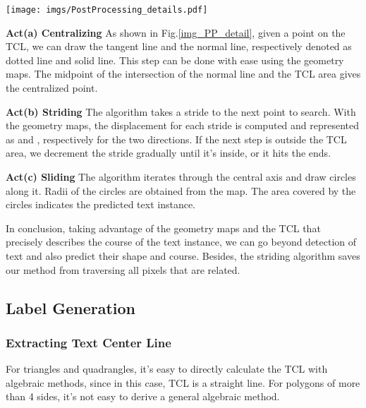 \documentclass[runningheads]{llncs}
\begin{document}
\begin{figure*}
\begin{centering}
\texttt{[image: imgs/PostProcessing\_details.pdf]}
\par\end{centering}
\vspace{-4mm}
\caption{Mechanisms of Centralizing, Striding and Sliding}
\label{img_PP_detail}
\end{figure*}

\noindent\textbf{Act(a) Centralizing} As shown in Fig.\ref{img_PP_detail}, given a point on the TCL, we can draw the tangent line and the normal line, respectively denoted as dotted line and solid line.  This step can be done with ease using the geometry maps. The midpoint of the intersection of the normal line and the TCL area gives the centralized point.

\noindent\textbf{Act(b) Striding} The algorithm takes a stride to the next point to search. With the geometry maps, the displacement for each stride is computed and represented as  and , respectively for the two directions. If the next step is outside the TCL area, we decrement the stride gradually until it's inside, or it hits the ends.

\noindent\textbf{Act(c) Sliding} The algorithm iterates through the central axis and draw circles along it.  Radii of the circles are obtained from the  map. The area covered by the circles indicates the predicted text instance.



In conclusion, taking advantage of the geometry maps and the TCL that precisely describes the course of the text instance, we can go beyond detection of text and also predict their shape and course. Besides, the striding algorithm saves our method from traversing all pixels that are related.

\subsection{Label Generation}
 
\subsubsection{Extracting Text Center Line}

For triangles and quadrangles, it's easy to directly calculate the TCL with algebraic methods, since in this case, TCL is a straight line. For polygons of more than 4 sides, it's not easy to derive a general algebraic method. 
\end{document}
